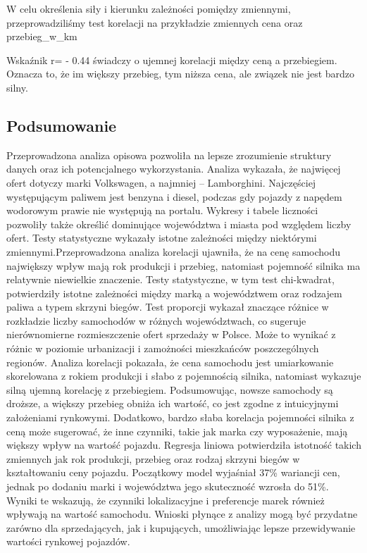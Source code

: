 \documentclass[
]{article}
\newenvironment{Shaded}{\begin{snugshade}}{\end{snugshade}}
\newcommand{\AttributeTok}[1]{\textcolor[rgb]{0.13,0.29,0.53}{#1}}
\newcommand{\FunctionTok}[1]{\textcolor[rgb]{0.13,0.29,0.53}{\textbf{#1}}}
\newcommand{\NormalTok}[1]{#1}
\newcommand{\OtherTok}[1]{\textcolor[rgb]{0.56,0.35,0.01}{#1}}
\newcommand{\SpecialCharTok}[1]{\textcolor[rgb]{0.81,0.36,0.00}{\textbf{#1}}}
\newcommand{\StringTok}[1]{\textcolor[rgb]{0.31,0.60,0.02}{#1}}
\begin{document}
W celu określenia siły i kierunku zależności pomiędzy zmiennymi,
przeprowadziliśmy test korelacji na przykładzie zmiennych cena oraz
przebieg\_w\_km

\begin{Shaded}
\end{Shaded}

Wskaźnik r= - 0.44 świadczy o ujemnej korelacji między ceną a
przebiegiem. Oznacza to, że im większy przebieg, tym niższa cena, ale
związek nie jest bardzo silny.

\subsection{Podsumowanie}\label{podsumowanie}

Przeprowadzona analiza opisowa pozwoliła na lepsze zrozumienie struktury
danych oraz ich potencjalnego wykorzystania. Analiza wykazała, że
najwięcej ofert dotyczy marki Volkswagen, a najmniej -- Lamborghini.
Najczęściej występującym paliwem jest benzyna i diesel, podczas gdy
pojazdy z napędem wodorowym prawie nie występują na portalu. Wykresy i
tabele liczności pozwoliły także określić dominujące województwa i
miasta pod względem liczby ofert. Testy statystyczne wykazały istotne
zależności między niektórymi zmiennymi.Przeprowadzona analiza korelacji
ujawniła, że na cenę samochodu największy wpływ mają rok produkcji i
przebieg, natomiast pojemność silnika ma relatywnie niewielkie
znaczenie. Testy statystyczne, w tym test chi-kwadrat, potwierdziły
istotne zależności między marką a województwem oraz rodzajem paliwa a
typem skrzyni biegów. Test proporcji wykazał znaczące różnice w
rozkładzie liczby samochodów w różnych województwach, co sugeruje
nierównomierne rozmieszczenie ofert sprzedaży w Polsce. Może to wynikać
z różnic w poziomie urbanizacji i zamożności mieszkańców poszczególnych
regionów. Analiza korelacji pokazała, że cena samochodu jest
umiarkowanie skorelowana z rokiem produkcji i słabo z pojemnością
silnika, natomiast wykazuje silną ujemną korelację z przebiegiem.
Podsumowując, nowsze samochody są droższe, a większy przebieg obniża ich
wartość, co jest zgodne z intuicyjnymi założeniami rynkowymi. Dodatkowo,
bardzo słaba korelacja pojemności silnika z ceną może sugerować, że inne
czynniki, takie jak marka czy wyposażenie, mają większy wpływ na wartość
pojazdu. Regresja liniowa potwierdziła istotność takich zmiennych jak
rok produkcji, przebieg oraz rodzaj skrzyni biegów w kształtowaniu ceny
pojazdu. Początkowy model wyjaśniał 37\% wariancji cen, jednak po
dodaniu marki i województwa jego skuteczność wzrosła do 51\%. Wyniki te
wskazują, że czynniki lokalizacyjne i preferencje marek również wpływają
na wartość samochodu. Wnioski płynące z analizy mogą być przydatne
zarówno dla sprzedających, jak i kupujących, umożliwiając lepsze
przewidywanie wartości rynkowej pojazdów.
\end{document}
